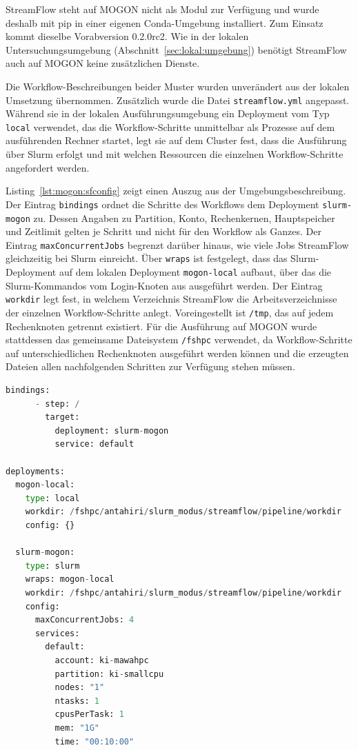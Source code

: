 StreamFlow steht auf MOGON nicht als Modul zur Verfügung und wurde
deshalb mit pip in einer eigenen Conda-Umgebung installiert. Zum
Einsatz kommt dieselbe Vorabversion 0.2.0rc2. Wie in der lokalen
Untersuchungsumgebung (Abschnitt~\ref{sec:lokal:umgebung}) benötigt
StreamFlow auch auf MOGON keine zusätzlichen Dienste.

Die Workflow-Beschreibungen beider Muster wurden unverändert aus der 
lokalen Umsetzung übernommen. Zusätzlich wurde die Datei \texttt{streamflow.yml} angepasst. Während sie in der lokalen Ausführungsumgebung ein Deployment vom Typ \texttt{local} verwendet,
das die Workflow-Schritte unmittelbar als Prozesse auf dem ausführenden Rechner startet, legt sie auf dem Cluster fest, dass die Ausführung über Slurm erfolgt und mit welchen Ressourcen die einzelnen Workflow-Schritte angefordert werden.

Listing~\ref{lst:mogon:sfconfig} zeigt einen Auszug aus der
Umgebungsbeschreibung. Der Eintrag \texttt{bindings} ordnet die
Schritte des Workflows dem Deployment \texttt{slurm-mogon} zu.
Dessen Angaben zu Partition, Konto, Rechenkernen, Hauptspeicher und
Zeitlimit gelten je Schritt und nicht für den Workflow als Ganzes.
Der Eintrag \texttt{maxConcurrentJobs} begrenzt darüber hinaus, wie
viele Jobs StreamFlow gleichzeitig bei Slurm einreicht. Über
\texttt{wraps} ist festgelegt, dass das Slurm-Deployment auf dem
lokalen Deployment \texttt{mogon-local} aufbaut, über das die
Slurm-Kommandos vom Login-Knoten aus ausgeführt werden. Der Eintrag
\texttt{workdir} legt fest, in welchem Verzeichnis StreamFlow die
Arbeitsverzeichnisse der einzelnen Workflow-Schritte anlegt.
Voreingestellt ist \texttt{/tmp}, das auf jedem Rechenknoten
getrennt existiert. Für die Ausführung auf MOGON wurde stattdessen
das gemeinsame Dateisystem \texttt{/fshpc} verwendet, da
Workflow-Schritte auf unterschiedlichen Rechenknoten ausgeführt
werden können und die erzeugten Dateien allen nachfolgenden
Schritten zur Verfügung stehen müssen.

\begin{lstlisting}[language=Python,
  caption={Auszug aus der Umgebungsbeschreibung von StreamFlow für die Ausführung auf MOGON},
  label={lst:mogon:sfconfig}]
    bindings:
      - step: /
        target:
          deployment: slurm-mogon
          service: default

deployments:
  mogon-local:
    type: local
    workdir: /fshpc/antahiri/slurm_modus/streamflow/pipeline/workdir
    config: {}

  slurm-mogon:
    type: slurm
    wraps: mogon-local
    workdir: /fshpc/antahiri/slurm_modus/streamflow/pipeline/workdir
    config: 
      maxConcurrentJobs: 4
      services:
        default:
          account: ki-mawahpc
          partition: ki-smallcpu
          nodes: "1"
          ntasks: 1
          cpusPerTask: 1
          mem: "1G"
          time: "00:10:00"
\end{lstlisting}

